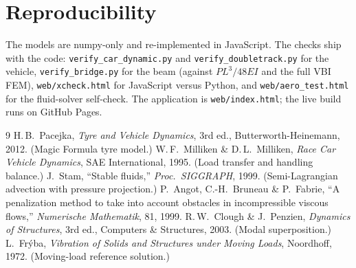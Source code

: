 \documentclass[11pt,a4paper]{article}
\begin{document}
\section{Reproducibility}
\begin{sloppypar}
The models are numpy-only and re-implemented in JavaScript. The checks ship with the code:
\texttt{verify\_car\_dynamic.py} and \texttt{verify\_doubletrack.py} for the vehicle,
\texttt{verify\_bridge.py} for the beam (against $PL^3/48EI$ and the full VBI FEM),
\texttt{web/xcheck.html} for JavaScript versus Python, and \texttt{web/aero\_test.html} for the
fluid-solver self-check. The application is \texttt{web/index.html}; the live build runs on
GitHub Pages.
\end{sloppypar}

\begin{thebibliography}{9}
\small
{} H.\,B.\ Pacejka, \emph{Tyre and Vehicle Dynamics}, 3rd ed.,
  Butterworth-Heinemann, 2012. (Magic Formula tyre model.)
 W.\,F.\ Milliken \& D.\,L.\ Milliken, \emph{Race Car Vehicle Dynamics},
  SAE International, 1995. (Load transfer and handling balance.)
 J.\ Stam, ``Stable fluids,'' \emph{Proc.\ SIGGRAPH}, 1999.
  (Semi-Lagrangian advection with pressure projection.)
 P.\ Angot, C.-H.\ Bruneau \& P.\ Fabrie, ``A penalization method to take into
  account obstacles in incompressible viscous flows,'' \emph{Numerische Mathematik}, 81, 1999.
 R.\,W.\ Clough \& J.\ Penzien, \emph{Dynamics of Structures}, 3rd ed.,
  Computers \& Structures, 2003. (Modal superposition.)
 L.\ Frýba, \emph{Vibration of Solids and Structures under Moving Loads},
  Noordhoff, 1972. (Moving-load reference solution.)
\end{thebibliography}
\end{document}
